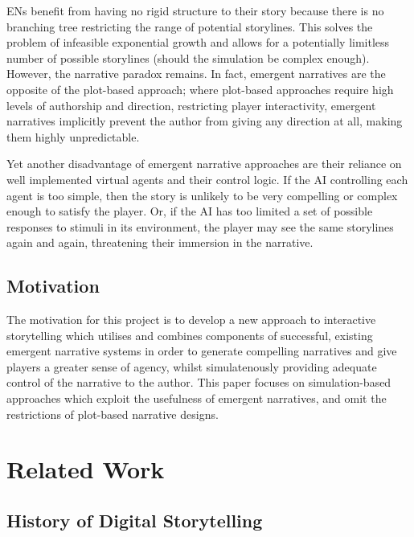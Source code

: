 \documentclass{sig-alternate-05-2015}
\begin{document}
\noindent ENs benefit from having no rigid structure to their story because there is no branching tree restricting the range of potential storylines. This solves the problem of infeasible exponential growth and allows for a potentially limitless number of possible storylines (should the simulation be complex enough). However, the narrative paradox remains. In fact, emergent narratives are the opposite of the plot-based approach; where plot-based approaches require high levels of authorship and direction, restricting player interactivity, emergent narratives implicitly prevent the author from giving any direction at all, making them highly unpredictable.

Yet another disadvantage of emergent narrative approaches are their reliance on well implemented virtual agents and their control logic. If the AI controlling each agent is too simple, then the story is unlikely to be very compelling or complex enough to satisfy the player. Or, if the AI has too limited a set of possible responses to stimuli in its environment, the player may see the same storylines again and again, threatening their immersion in the narrative.

\subsection{Motivation}

\noindent The motivation for this project is to develop a new approach to interactive storytelling which utilises and combines components of successful, existing emergent narrative systems in order to generate compelling narratives and give players a greater sense of agency, whilst simulatenously providing adequate control of the narrative to the author. This paper focuses on simulation-based approaches which exploit the usefulness of emergent narratives, and omit the restrictions of plot-based narrative designs.

\section{Related Work}
\subsection{History of Digital Storytelling}
\end{document}
